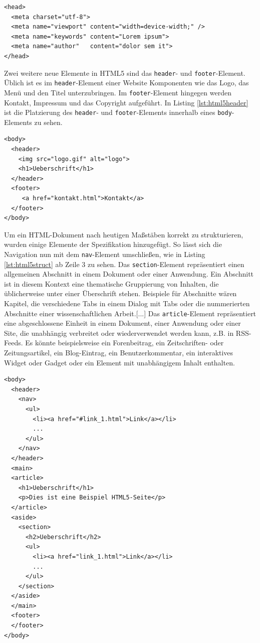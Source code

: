 \vspace{1em}
\begin{lstlisting}[language=HTML5, caption=HTML5 \texttt{meta}-Element, label=lst:html5meta]
<head>
  <meta charset="utf-8">
  <meta name="viewport" content="width=device-width;" />
  <meta name="keywords" content="Lorem ipsum">
  <meta name="author"   content="dolor sem it">
</head>
\end{lstlisting}
		
Zwei weitere neue Elemente in HTML5 sind das \texttt{header}- und \texttt{footer}-Element. Üblich ist es im \texttt{header}-Element einer Website Komponenten wie das Logo, das Menü und den Titel unterzubringen. Im \texttt{footer}-Element hingegen werden Kontakt, Impressum und das Copyright aufgeführt. In Listing \ref{lst:html5header} ist die Platzierung des \texttt{header}- und \texttt{footer}-Elements innerhalb eines \texttt{body}-Elements zu sehen.

\vspace{1em}
\begin{lstlisting}[language=HTML5, caption=HTML5 \texttt{header}- und \texttt{footer}-Element, label=lst:html5header]
<body>
  <header>
    <img src="logo.gif" alt="logo">
    <h1>Ueberschrift</h1>
  </header>
  <footer>
     <a href="kontakt.html">Kontakt</a>
  </footer>
</body>
\end{lstlisting}
	
Um ein HTML-Dokument nach heutigen Maßstäben korrekt zu strukturieren, wurden einige Elemente der Spezifikation hinzugefügt. So lässt sich die Navigation nun mit dem \texttt{nav}-Element umschließen, wie in Listing \ref{lst:html5struct} ab Zeile 3 zu sehen. \glqq Das \texttt{section}-Element repräsentiert einen allgemeinen Abschnitt in einem Dokument oder einer Anwendung. Ein Abschnitt ist in diesem Kontext eine thematische Gruppierung von Inhalten, die üblicherweise unter einer Überschrift stehen. Beispiele für Abschnitte wären Kapitel, die verschiedene Tabs in einem Dialog mit Tabs oder die nummerierten Abschnitte einer wissenschaftlichen Arbeit.[...] Das \texttt{article}-Element repräsentiert eine abgeschlossene Einheit in einem Dokument, einer Anwendung oder einer Site, die unabhängig verbreitet oder wiederverwendet werden kann, z.B. in RSS-Feeds. Es könnte beispielsweise ein Forenbeitrag, ein Zeitschriften- oder Zeitungsartikel, ein Blog-Eintrag, ein Benutzerkommentar, ein interaktives Widget oder Gadget oder ein Element mit unabhängigem Inhalt enthalten.

\vspace{1em}
\begin{lstlisting}[language=HTML5, caption=HTML5 Struktur Elemente, label=lst:html5struct]
<body>
  <header>
    <nav>
      <ul>
        <li><a href="#link_1.html">Link</a></li>
        ...
      </ul>
    </nav>
  </header>
  <main>
  <article>
    <h1>Ueberschrift</h1>
    <p>Dies ist eine Beispiel HTML5-Seite</p>
  </article>
  <aside>
    <section>
      <h2>Ueberschrift</h2>
      <ul>
        <li><a href="link_1.html">Link</a></li>
        ...
      </ul>
    </section>
  </aside>
  </main>
  <footer>
  </footer>
</body>
\end{lstlisting}
	
